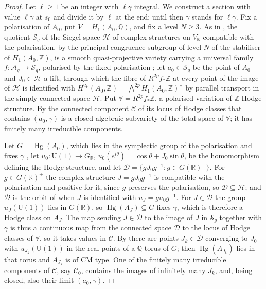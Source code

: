 \documentclass[11pt,reqno]{amsart}
\theoremstyle{plain}
\theoremstyle{definition}
\theoremstyle{remark}
\newcommand{\QQ}{\mathbb{Q}}
\newcommand{\ZZ}{\mathbb{Z}}
\newcommand{\RR}{\mathbb{R}}
\newcommand{\cH}{\mathcal{H}}
\newcommand{\cA}{\mathcal{A}}
\newcommand{\cD}{\mathcal{D}}
\newcommand{\cS}{\mathcal{S}}
\DeclareMathOperator{\Hg}{Hg}
\begin{document}
\begin{proof}
Let $\ell\ge1$ be an integer with $\ell\gamma$ integral. We construct a
section with value $\ell\gamma$ at $s_{0}$ and divide it by $\ell$ at the
end; until then $\gamma$ stands for $\ell\gamma$. Fix a polarisation of
$A_{0}$, put $V=H_{1}(A_{0},\QQ)$, and fix a level $N\ge3$. As in \cite[Setup~16.1]{paperI}, the
quotient $\cS_{g}$ of the Siegel space $\cH$ of complex structures on
$V_{\RR}$ compatible with the polarisation, by the principal congruence
subgroup of level $N$ of the stabiliser of $H_{1}(A_{0},\ZZ)$, is a smooth
quasi-projective variety carrying a universal family $f\colon\cA_{g}\to\cS_{g}$,
polarised by the fixed polarisation \cite{BB66}; let $a_{0}\in\cS_{g}$ be the
point of $A_{0}$ and $J_{0}\in\cH$ a lift, through which the fibre of
$R^{2p}f_{*}\ZZ$ at every point of the image of $\cH$ is identified with
$H^{2p}(A_{0},\ZZ)=\bigwedge^{2p}H_{1}(A_{0},\ZZ)^{\vee}$ by parallel
transport in the simply connected space $\cH$. Put
$\mathbb{V}=R^{2p}f_{*}\ZZ$, a polarised variation of $\ZZ$-Hodge
structure. By \cite[Theorem~B.6]{paperI} the connected component $\mathcal{C}$ of its
locus of Hodge classes that contains $(a_{0},\gamma)$ is a closed algebraic
subvariety of the total space of $\mathbb{V}$; it has finitely many
irreducible components.

Let $G=\Hg(A_{0})$, which lies in the symplectic group of the polarisation
and fixes $\gamma$ \cite[\S3]{Del82}, let
$u_{0}\colon\mathrm{U}(1)\to G_{\RR}$,
$u_{0}(e^{i\theta})=\cos\theta+J_{0}\sin\theta$, be the homomorphism defining
the Hodge structure, and let
$\cD=\{gJ_{0}g^{-1}:g\in G(\RR)^{+}\}$. For $g\in G(\RR)^{+}$ the complex
structure $J=gJ_{0}g^{-1}$ is compatible with the polarisation and positive
for it, since $g$ preserves the polarisation, so $\cD\subseteq\cH$; and
$\cD$ is the orbit of  when $J$ is identified with
$u_{J}=gu_{0}g^{-1}$. For $J\in\cD$ the group $u_{J}(\mathrm{U}(1))$ lies in
$G(\RR)$, so $\Hg(A_{J})\subseteq G$ fixes $\gamma$, which is therefore a
Hodge class on $A_{J}$. The map sending $J\in\cD$ to the image of $J$ in
$\cS_{g}$ together with $\gamma$ is thus a continuous map from the
connected space $\cD$ to the locus of Hodge classes of $\mathbb{V}$, so it
takes values in $\mathcal{C}$. By  there are points
$J_{k}\in\cD$ converging to $J_{0}$ with $u_{J_{k}}(\mathrm{U}(1))$ in the
real points of a $\QQ$-torus of $G$; then $\Hg(A_{J_{k}})$ lies in that torus
and $A_{J_{k}}$ is of CM type. One of the finitely many irreducible
components of $\mathcal{C}$, say $\mathcal{C}_{0}$, contains the images of
infinitely many $J_{k}$, and, being closed, also their limit $(a_{0},\gamma)$.


\end{proof}
\end{document}
